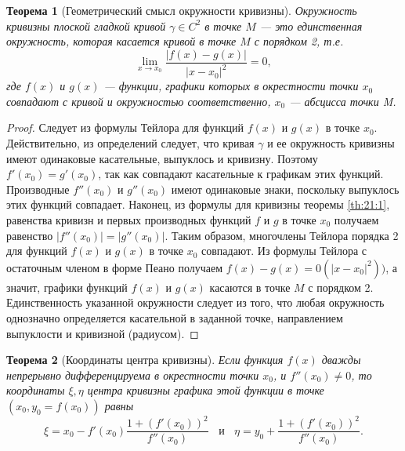 \documentclass[12pt]{report}
\numberwithin{equation}{section}
\newtheorem{theorem}{Теорема}[section]
\begin{document}
\begin{theorem} [Геометрический смысл окружности кривизны] \label{th:22:1}
Окружность кривизны плоской гладкой кривой $\gamma \in C^2$ в точке $M$ --- это единственная окружность, которая касается кривой в точке $M$ с порядком 2, т.е.
\[ \lim_{x \to x_0} \frac{|f(x) - g(x)|}{|x - x_0|^2} = 0,\] 
где $f(x)$ и $g(x)$ --- функции, графики которых в окрестности точки $x_0$ совпадают с кривой и окружностью соответственно, $x_0$ --- абсцисса точки M.
\end{theorem}
\begin{proof}
Следует из формулы Тейлора для функций $f(x)$ и $g(x)$ в точке $x_0$. Действительно, из определений следует, что кривая $\gamma$ и ее окружность кривизны имеют одинаковые касательные, выпуклось и кривизну. Поэтому $f'(x_0) = g'(x_0)$, так как совпадают касательные к графикам этих функций. Производные $f''(x_0)$ и $g''(x_0)$ имеют одинаковые знаки, поскольку выпуклось этих функций совпадает. Наконец, из формулы для кривизны теоремы \ref{th:21:1}, равенства кривизн и первых производных функций $f$ и $g$ в точке $x_0$ получаем равенство $|f''(x_0)| = |g''(x_0)|$. Таким образом, многочлены Тейлора порядка 2 для функций $f(x)$ и $g(x)$ в точке $x_0$ совпадают. Из формулы Тейлора с остаточным членом в форме Пеано получаем $f(x) - g(x) = 0(|x- x_0|^2))$, а значит, графики функций $f(x)$ и $g(x)$ касаются в точке $M$ с порядком 2.\\

Единственность указанной окружности следует из того, что любая окружность однозначно определяется касательной в заданной точке, направлением выпуклости и кривизной (радиусом).
\end{proof}

\begin{theorem}[Координаты центра кривизны]
Если функция $f(x)$ дважды непрерывно дифференцируема в окрестности точки $x_0$, и $f''(x_0) \neq 0$, то координаты $\xi, \eta$ центра кривизны графика этой функции в точке $(x_0,y_0 = f(x_0))$ равны
\begin{equation} \label{eq:22:1}
\xi = x_0 - f'(x_0) \frac{1 + (f'(x_0))^2}{f''(x_0)}~~~~\text{и}~~~~\eta = y_0 + \frac{1 + (f'(x_0))^2}{f''(x_0)}.
\end{equation}
\end{theorem}
\end{document}
